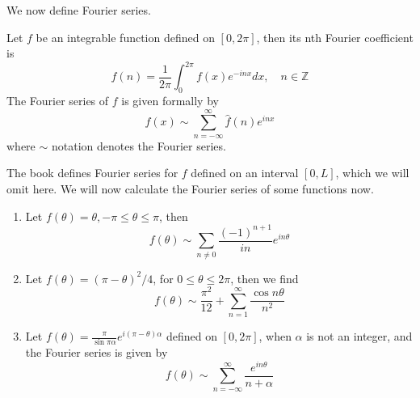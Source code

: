 We now define Fourier series.
\begin{defn}
    Let $f$ be an integrable function defined on $[0,2\pi]$, then its nth Fourier coefficient is 
\begin{equation*}
    \hat{f}(n)=\frac{1}{2\pi}\int_0^{2\pi}f(x)e^{-inx}dx, \quad n\in\mathbb{Z}
\end{equation*}
The Fourier series of $f$ is given formally by 
\begin{equation*}
    f(x)\sim \sum_{n=-\infty}^{\infty}\hat{f}(n)e^{inx}
\end{equation*}
    where $\sim$ notation denotes the Fourier series.
\end{defn}
The book defines Fourier series for $f$ defined on an interval $[0,L]$, which we will omit here. We will now calculate the Fourier series of some functions now.
\begin{example}
    \begin{enumerate}
        \item Let $f(\theta)=\theta, -\pi\leq\theta\leq\pi$, then 
        \begin{equation*}
            f(\theta)\sim\sum_{n\neq 0}\frac{(-1)^{n+1}}{in}e^{in\theta}
        \end{equation*}
        \item Let $f(\theta)=(\pi-\theta)^2/4$, for $0\leq\theta\leq 2\pi$, then we find 
        \begin{equation*}
            f(\theta)\sim\frac{\pi^2}{12}+\sum_{n=1}^\infty\frac{\cos n\theta}{n^2}
        \end{equation*}
        \item Let $f(\theta)=\frac{\pi}{\sin\pi\alpha}e^{i(\pi-\theta)\alpha}$ defined on $[0,2\pi]$, when $\alpha$ is not an integer, and the Fourier series is given by 
        \begin{equation*}
            f(\theta)\sim\sum_{n=-\infty}^{\infty}\frac{e^{in\theta}}{n+\alpha}
        \end{equation*}
    \end{enumerate}
\end{example}
